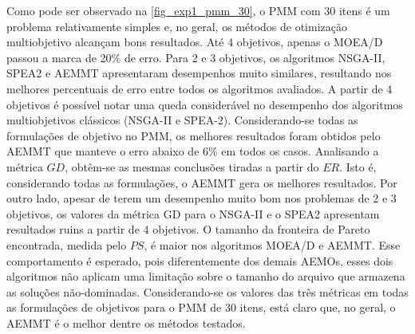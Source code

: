Como pode ser observado na \autoref{fig_exp1_pmm_30}, o PMM com 30 itens é um problema relativamente simples e, no geral, os métodos de otimização multiobjetivo alcançam bons resultados. Até 4 objetivos, apenas o MOEA/D passou a marca de 20\% de erro. Para 2 e 3 objetivos, os algoritmos NSGA-II, SPEA2 e AEMMT apresentaram desempenhos muito similares, resultando nos melhores percentuais de erro entre todos os algoritmos avaliados. A partir de 4 objetivos é possível notar uma queda considerável no desempenho dos algoritmos multiobjetivos clássicos (NSGA-II e SPEA-2). Considerando-se todas as formulações de objetivo no PMM, os melhores resultados foram obtidos pelo AEMMT que manteve o erro abaixo de 6\% em todos os casos. Analisando a métrica $GD$, obtêm-se as mesmas conclusões tiradas a partir do $ER$. Isto é, considerando todas as formulações, o AEMMT gera os melhores resultados. Por outro lado, apesar de terem um desempenho muito bom nos problemas de 2 e 3 objetivos, os valores da métrica GD para o NSGA-II e o SPEA2 apresentam resultados ruins a partir de 4 objetivos. O tamanho da fronteira de Pareto encontrada, medida pelo $PS$, é maior nos algoritmos MOEA/D e AEMMT. Esse comportamento é esperado, pois diferentemente dos demais AEMOs, esses dois algoritmos não aplicam uma limitação sobre o tamanho do arquivo que armazena as soluções não-dominadas. Considerando-se os valores das três métricas em todas as formulações de objetivos para o PMM de 30 itens, está claro que, no geral, o AEMMT é o melhor dentre os métodos testados.

